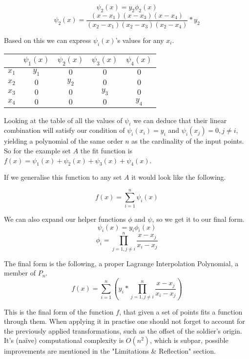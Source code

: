\documentclass[12pt, titlepage]{article}
\begin{document}
\begin{equation}
    \psi_2(x) = y_2 \phi_2(x)
\end{equation}
\begin{equation}
    \psi_2(x) = \frac{(x - x_1)(x - x_3)(x - x_4)}{(x_2 - x_1)(x_2 - x_3)(x_2 - x_4)} * y_2
\end{equation}

Based on this we can express $\psi_i(x)$'s values for any $x_i$.

{
\centering
\begin{tabular}{c|c c c c}
    & $\psi_1(x) $ & $\psi_2(x)$ & $\psi_3(x)$ & $\psi_4(x)$ \\
    \hline
    $x_1$ & $y_1$ & $0$ & $0$ & $0$ \\
    $x_2$ & $0$ & $y_2$ & $0$ & $0$ \\
    $x_3$ & $0$ & $0$ & $y_3$ & $0$ \\
    $x_4$ & $0$ & $0$ & $0$ & $y_4$ \\
\end{tabular}\par
}

Looking at the table of all the values of $\psi_i$ we can deduce that their linear
combination will satisfy our condition of $\psi_i(x_i) = y_i$ and 
$\psi_i(x_j) = 0, j \neq i$, yielding a polynomial of the same order $n$
as the cardinality of the input points.
So for the example set $A$ the fit function is 
$f(x) = \psi_1(x) + \psi_2(x) + \psi_3(x) + \psi_4(x)$.

If we generalise this function to any set $A$ it would look
like the following.

\begin{equation}
    f(x) = \sum_{i=1}^{n}\psi_i(x)
\end{equation}

We can also expand our helper functions $\phi$ and $\psi$, so we get it to our 
final form.
$$\psi_i(x) = y_i \phi_i(x)$$
\begin{equation}
    \phi_i = \prod_{j=1, j \neq i}^{n}\frac{x - x_j}{x_i - x_j}
\end{equation}

The final form is the following, a proper Lagrange Interpolation Polynomial,
a member of $P_n$. 
\begin{equation}
f(x) = \sum_{i=1}^{n} \left(y_i * \prod_{j=1, j \neq i}^{n} \frac{x - x_j}{x_i - x_j}\right)
\end{equation}

This is the final form of the function $f$, that given a set of points 
fits a function through them. When applying it in practise one should 
not forget to account for the previously applied transformations, such as 
the offset of the soldier's origin. It's (na\"ive) computational complexity
is $O(n^2)$, which is subpar, possible improvements are mentioned in the 
"Limitations \& Reflection" section.
\end{document}
